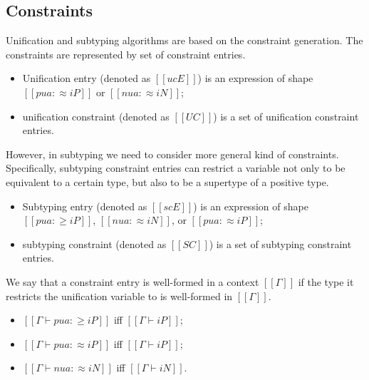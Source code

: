 \documentclass[a4,natbib=false]{article}
\begin{document}
\subsection{Constraints}

Unification and subtyping algorithms are based on the constraint generation.
The constraints are represented by set of constraint entries.

\begin{definition}
  \hfill
  \begin{itemize}
    \item Unification entry (denoted as $[[ucE]]$) is an expression of shape 
      $[[pua :≈ iP]]$ or $[[nua :≈ iN]]$;
    \item unification constraint (denoted as $[[UC]]$) is a set of 
      unification constraint entries.
  \end{itemize}
\end{definition}

However, in subtyping we need to consider more general
kind of constraints. Specifically,
subtyping constraint entries can restrict a variable
not only to be equivalent to a certain type, but
also to be a supertype of a positive type.

\begin{definition}
  \hfill
  \begin{itemize}
    \item Subtyping entry (denoted as $[[scE]]$) is an expression of shape 
      $[[pua :≥ iP]]$, $[[nua :≈ iN]]$, or $[[pua :≈ iP]]$;
    \item subtyping constraint (denoted as $[[SC]]$) is a set of subtyping constraint entries.
  \end{itemize}
\end{definition}

\begin{definition}
  We say that a constraint entry is well-formed in a context $[[Γ]]$ if
  the type it restricts the unification variable to is well-formed in $[[Γ]]$.
  \begin{itemize}
    \item $[[Γ ⊢ pua :≥ iP]]$ iff $[[Γ ⊢ iP]]$;
    \item $[[Γ ⊢ pua :≈ iP]]$ iff $[[Γ ⊢ iP]]$;
    \item $[[Γ ⊢ nua :≈ iN]]$ iff $[[Γ ⊢ iN]]$.
  \end{itemize}
\end{definition}
\end{document}
